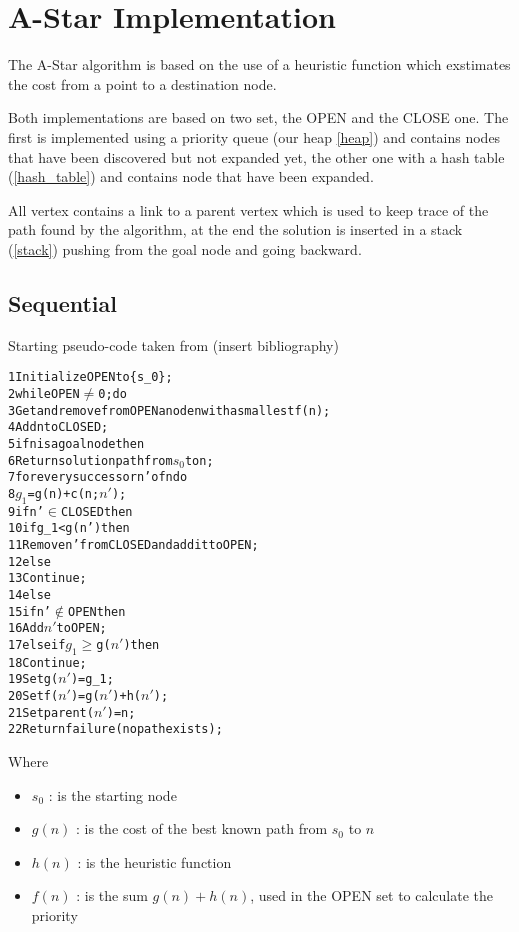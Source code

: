 \section{A-Star Implementation}
\label{Sec:implementation}

The A-Star algorithm is based on the use of a heuristic function which exstimates the cost from a point to a destination node.

Both implementations are based on two set, the OPEN and the CLOSE one. The first is implemented using a priority queue (our heap \ref{heap}) and contains nodes that have been discovered but not expanded yet, the other one with a hash table (\ref{hash_table}) and contains node that have been expanded.

All vertex contains a link to a parent vertex which is used to keep trace of the path found by the algorithm, at the end the solution is inserted in a stack (\ref{stack}) pushing from the goal node and going backward.

\subsection{Sequential}

Starting pseudo-code taken from (insert bibliography)

\begin{alltt}
    1 Initialize OPEN to \{s_0\};
    2 while OPEN \(\neq\) 0; do
    3 Get and remove from OPEN a node n with a smallest f(n);
    4 Add n to CLOSED;
    5 if n is a goal node then
    6   Return solution path from \(s_0\) to n;
    7 for every successor n' of n do
    8   $g_1$ = g(n) + c(n; \(n'\));
    9   if n' \(\in\) CLOSED then
    10      if g_1 < g(n') then
    11          Remove n' from CLOSED and add it to OPEN;
    12      else
    13          Continue;
    14  else
    15      if n' \(\notin\) OPEN then
    16          Add $n'$ to OPEN;
    17      else if $g_1$ \(\geq\) g($n'$) then
    18          Continue;
    19  Set g($n'$) = g_1;
    20  Set f($n'$) = g($n'$) + h($n'$);
    21  Set parent($n'$) = n;
    22 Return failure (no path exists);
\end{alltt}

Where
\begin{itemize}
    \item $s_0$ : is the starting node
    \item $g(n)$ : is the cost of the best known path from $s_0$ to $n$
    \item $h(n)$ : is the heuristic function
    \item $f(n)$ : is the sum $g(n) + h(n)$, used in the OPEN set to calculate the priority
\end{itemize}

